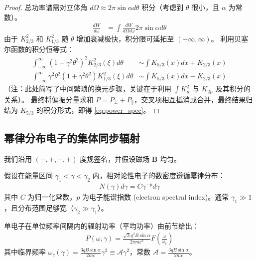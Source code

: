 \begin{proof}
    总功率谱需对立体角 $d\Omega \approx 2\pi \sin\alpha d\theta$ 积分（考虑到 $\theta$ 很小，且 $\alpha$ 为常数）。
    \begin{align}
        \frac{dW}{d\omega} &= \int \frac{dW}{d\Omega d\omega} 2\pi \sin\alpha d\theta
    \end{align}
    由于 $K_{2/3}^2$ 和 $K_{1/3}^2$ 随 $\theta$ 增加衰减极快，积分限可延拓至 $(-\infty, \infty)$。
    利用贝塞尔函数的积分恒等式：
    \begin{align}
        \int_{-\infty}^{\infty} (1+\gamma^2\theta^2)^2 K_{2/3}^2(\xi) d\theta &\sim \int K_{5/3}(x) dx + K_{2/3}(x) \\
        \int_{-\infty}^{\infty} \gamma^2\theta^2 (1+\gamma^2\theta^2) K_{1/3}^2(\xi) d\theta &\sim \int K_{5/3}(x) dx - K_{2/3}(x)
    \end{align}
    （注：此处简写了中间繁琐的换元步骤，关键在于利用 $\int K_\mu^2$ 与 $K_{2\mu}$ 及其积分的关系）。
    最终将偏振分量求和 $P = P_\perp + P_\parallel$，交叉项相互抵消或合并，最终结果归结为 $K_{5/3}$ 的积分形式，即得 \eqref{eq:power_spec}。
\end{proof}
\subsection{幂律分布电子的集体同步辐射}


我们沿用 $(-,+,+,+)$ 度规签名，并假设磁场 $\mathbf{B}$ 均匀。

\begin{definition}[电子的幂律分布]
    假设在能量区间 $\gamma_1 < \gamma < \gamma_2$ 内，相对论性电子的数密度遵循幂律分布：
    \begin{align}
        N(\gamma) d\gamma = C \gamma^{-p} d\gamma \label{eq:power_law_dist}
    \end{align}
    其中 $C$ 为归一化常数，$p$ 为电子能谱指数 (electron spectral index)。通常 $\gamma_1 \gg 1$，且分布范围足够宽（$\gamma_2 \gg \gamma_1$）。
\end{definition}

单电子在单位频率间隔内的辐射功率（平均功率）由前节给出：
\begin{align}
        P(\omega, \gamma) = \frac{\sqrt{3} q^3 B \sin\alpha}{2\pi m c^2} F\left( \frac{\omega}{\omega_c} \right)
\end{align}
其中临界频率 $\omega_c(\gamma) = \frac{3 q B \sin\alpha}{2 m c} \gamma^2 \equiv \mathcal{A} \gamma^2$，常数 $\mathcal{A} = \frac{3 q B \sin\alpha}{2 m c}$。

